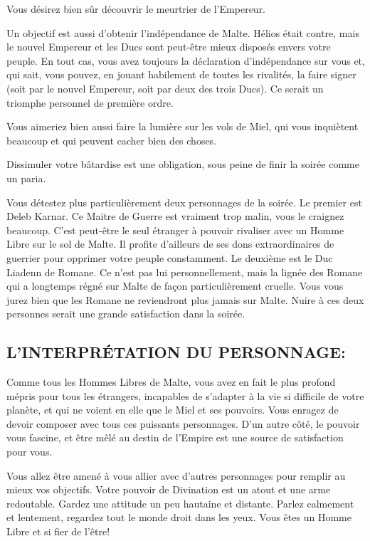 \documentclass[14pt,twocolumn]{extarticle}
\begin{document}
Vous désirez bien sûr découvrir le meurtrier de l'Empereur.

Un objectif est aussi d'obtenir l'indépendance de Malte. Hélios était contre,
mais le nouvel Empereur et les Ducs sont peut-être mieux disposés envers votre
peuple. En tout cas, vous avez toujours la déclaration d'indépendance sur vous
et, qui sait, vous pouvez, en jouant habilement de toutes les rivalités, la
faire signer (soit par le nouvel Empereur, soit par deux des trois Ducs). Ce
serait un triomphe personnel de première ordre.

Vous aimeriez bien aussi faire la lumière sur les vols de Miel, qui vous
inquiètent beaucoup et qui peuvent cacher bien des choses.

Dissimuler votre bâtardise est une obligation, sous peine de finir la soirée
comme un paria.

Vous détestez plus particulièrement deux personnages de la soirée. Le premier
est Deleb Karnar. Ce Maitre de Guerre est vraiment trop malin, vous le craignez
beaucoup. C'est peut-être le seul \og étranger\fg{} à pouvoir rivaliser avec un
Homme Libre sur le sol de Malte. Il profite d'ailleurs de ses dons
extraordinaires de guerrier pour opprimer votre peuple constamment.
Le deuxième est le Duc Liadenn de Romane. Ce n'est pas lui personnellement,
mais la lignée des Romane qui a longtemps régné sur Malte de façon
particulièrement cruelle. Vous vous jurez bien que les Romane ne reviendront
plus jamais sur Malte. Nuire à ces deux personnes serait une grande
satisfaction dans la soirée.

\subsection{L'INTERPRÉTATION DU PERSONNAGE:}

Comme tous les Hommes Libres de Malte, vous avez en fait le plus profond mépris
pour tous les étrangers, incapables de s'adapter à la vie si difficile de votre
planète, et qui ne voient en elle que le Miel et ses pouvoirs. Vous enragez de
devoir composer avec tous ces puissants personnages. D'un autre côté, le
pouvoir vous fascine, et être mêlé au destin de l'Empire est une source de
satisfaction pour vous.

Vous allez être amené à vous allier avec d'autres personnages pour remplir au
mieux vos objectifs. Votre pouvoir de Divination est un atout et une arme
redoutable. Gardez une attitude un peu hautaine et distante. Parlez calmement
et lentement, regardez tout le monde droit dans les yeux. Vous êtes un Homme
Libre et si fier de l'être!
\end{document}
